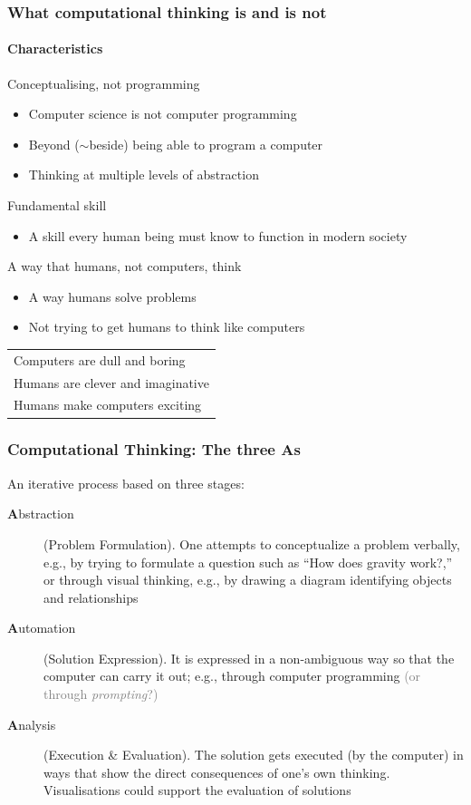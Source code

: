 \documentclass[xcolor=x11names,handout]{beamer}
\newcommand{\light}[1]{\textcolor{gray}{#1}}
\begin{document}
\begin{frame}
\frametitle{What computational thinking is and is not}
\framesubtitle{Characteristics}

\alert{Conceptualising, not programming}

\begin{itemize}
 \item Computer science is \alert{not} computer programming
 \item Beyond ($\sim$beside) being able to program a computer
 \item Thinking at multiple levels of abstraction
\end{itemize}			\pause

\alert{Fundamental skill}
\begin{itemize}
 \item A skill every human being must know to function in modern society
\end{itemize}	\pause

\alert{A way that humans, not computers, think}
\begin{itemize}
 \item A way humans solve problems
 \item Not trying to get humans to think like computers
\end{itemize}							\pause

\centering
\begin{tabular}{l}
Computers are dull and boring		\\	\pause
Humans are clever and imaginative	\\	\pause
Humans make computers exciting		\\
\end{tabular}
\end{frame}

\begin{frame}
\frametitle{Computational Thinking: The three As}

An iterative process based on three stages:

\begin{description}
	\item[\textbf{A}bstraction]	(Problem Formulation).
		One attempts to conceptualize a problem verbally, e.g., by trying to
formulate a question such as ``How does gravity work?,'' or through visual
thinking, e.g., by drawing a diagram identifying objects and relationships
		\pause

	\item[\textbf{A}utomation]	(Solution Expression).
	 	It is expressed in a non-ambiguous way so that the computer	can carry
it
out; e.g., through computer programming \light{(or through \textit{prompting}?)}
		\pause

	\item[\textbf{A}nalysis]  (Execution \& Evaluation).
	The solution gets executed (by the computer) in ways that show the direct
consequences of one's own thinking. Visualisations could support the evaluation
of solutions
\end{description}

\onslide
\flushright
\footnotesize
\citep{Repenning:16}
\end{frame}
\end{document}
